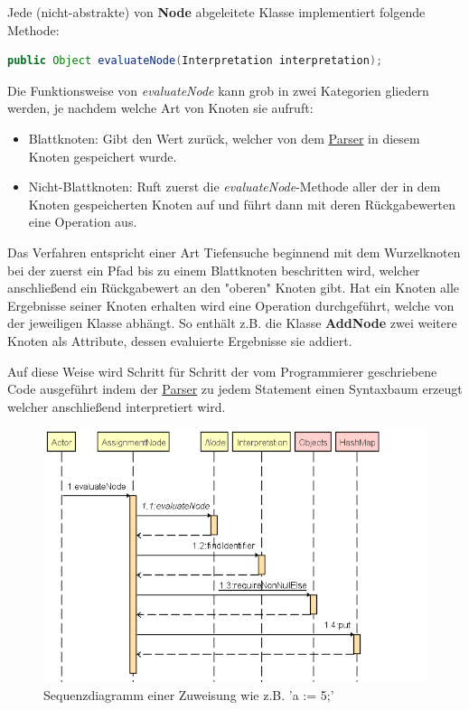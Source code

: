 Jede (nicht-abstrakte) von \textbf{Node} abgeleitete Klasse implementiert folgende Methode:


\begin{lstlisting}[caption=Funktionsdeklaration der Methode \textit{evaluateNode}, language=Java]
public Object evaluateNode(Interpretation interpretation);
\end{lstlisting}
Die Funktionsweise von \textit{evaluateNode} kann grob in zwei Kategorien gliedern werden, je nachdem welche Art von Knoten sie aufruft:
\begin{itemize}
  \item Blattknoten: Gibt den Wert zurück, welcher von dem \underline{Parser} in diesem Knoten gespeichert wurde.
  \item Nicht-Blattknoten: Ruft zuerst die \textit{evaluateNode}-Methode aller der in dem Knoten gespeicherten Knoten auf und führt dann mit deren Rückgabewerten eine Operation aus.
\end{itemize}
Das Verfahren entspricht einer Art Tiefensuche beginnend mit dem Wurzelknoten bei der zuerst ein Pfad bis zu einem Blattknoten beschritten wird, welcher anschließend ein Rückgabewert an den "oberen" Knoten gibt. Hat ein Knoten alle Ergebnisse seiner Knoten erhalten wird eine Operation durchgeführt, welche von der jeweiligen Klasse abhängt. So enthält z.B. die Klasse \textbf{AddNode} zwei weitere Knoten als Attribute, dessen evaluierte Ergebnisse sie addiert.


Auf diese Weise wird Schritt für Schritt der vom Programmierer geschriebene Code ausgeführt indem der \underline{Parser} zu jedem Statement einen Syntaxbaum erzeugt welcher anschließend interpretiert wird.

\begin{figure}[H]
\centering
	\includegraphics[width=1.1\textwidth]{images/AssignmentSequenz.png}\par\vspace{0.5cm}
	\caption{Sequenzdiagramm einer Zuweisung wie z.B. 'a := 5;'}
	\label{fig:sequence-assignment}
\end{figure}

